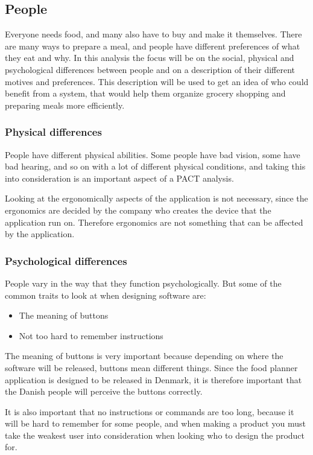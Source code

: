 \subsection{People}
Everyone needs food, and many also have to buy and make it themselves. There are many ways to prepare a meal, and people have different preferences of what they eat and why. In this analysis the focus will be on the social, physical and psychological differences between people and on a description of their different motives and preferences. This description will be used to get an idea of who could benefit from a system, that would help them organize grocery shopping and preparing meals more efficiently.

\subsubsection{Physical differences}

People have different physical abilities. Some people have bad vision, some have bad hearing, and so on with a lot of different physical conditions, and taking this into consideration is an important aspect of a PACT analysis.

Looking at the ergonomically aspects of the application is not necessary, since the ergonomics are decided by the company who creates the device that the application run on. Therefore ergonomics are not something that can be affected by the application.

\subsubsection{Psychological differences}

People vary in the way that they function psychologically. But some of the common traits to look at when designing software are:

\begin{itemize}
    \item The meaning of buttons
    \item Not too hard to remember instructions
\end{itemize}

The meaning of buttons is very important because depending on where the software will be released, buttons mean different things. Since the food planner application is designed to be released in Denmark, it is therefore important that the Danish people will perceive the buttons correctly.

It is also important that no instructions or commands are too long, because it will be hard to remember for some people, and when making a product you must take the weakest user into consideration when looking who to design the product for.

